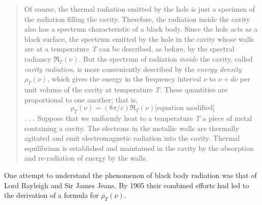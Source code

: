\begin{quotation}
Of course, the thermal radiation emitted by the hole is just a specimen
of the radiation filling the cavity. Therefore, the radiation inside the
cavity also has a spectrum characteristic of a black body. Since the
hole acts as a black surface, the spectrum emitted by the hole in the
cavity whose walls are at a temperature \emph{T} can be described, as
before, by the spectral radiancy $\Re_T(\nu)$. But the
spectrum of radiation \emph{inside} the cavity, called \emph{cavity
radiation}, is more conveniently described by the \emph{energy density}
$\rho_T(\nu)$, which gives the energy in the frequency
interval $\nu$ to $\nu\! +\! d\nu$ per unit volume of the cavity
at temperature \emph{T}. These quantities are proportional to one
another; that is,
%
\setcounter{equation}{3}
\begin{equation}
\rho_T(\nu) = (8\pi/c) \Re_T(\nu) \text{[equation modified]}
\end{equation}
%
. . . Suppose that we uniformly heat to a temperature \emph{T} a piece
of metal containing a cavity. The electrons in the metallic walls are
thermally agitated and emit electromagnetic radiation into the cavity.
Thermal equilibrium is established and maintained in the cavity by the
absorption and re-radiation of energy by the walls.
\end{quotation}

One attempt to understand the phenomenon of black body radiation was
that of Lord Rayleigh and Sir James Jeans. By 1905 their combined
efforts had led to the derivation of a formula for
$\rho_T(\nu)$.

